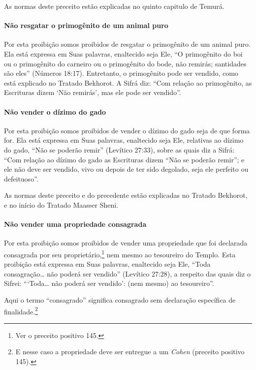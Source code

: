 As normas deste preceito estão explicadas no quinto capitulo de Temurá.

\paragraph{Não resgatar o primogênito de um animal puro}

Por esta proibição somos proibidos de resgatar o primogênito de um
animal puro. Ela está expressa em Suas palavras, enaltecido seja Ele,
``O primogênito do boi ou o primogênito do carneiro ou o primogênito do
bode, não remirás; santidades são eles'' (Números 18:17). Entretanto, o
primogênito pode ser vendido, como está explicado no Tratado Bekhorot. A
Sifrá diz: ``Com relação ao primogênito, as Escrituras dizem `Não
remirás', mas ele pode ser vendido''.

\paragraph{Não vender o dízimo do gado}

Por esta proibição somos proibidos de vender o dízimo do gado seja de
que forma for. Ela está expressa em Suas palavras, enaltecido seja Ele,
relativas ao dízimo do gado, ``Não se poderão remir'' (Levítico 27:33),
sobre as quais diz a Sifrá: ``Com relação ao dízimo do gado as
Escrituras dizem ``Não se poderão remir''; e ele não deve ser vendido,
vivo ou depois de ter sido degolado, seja ele perfeito ou defeituoso''.

As normas deste preceito e do precedente estão explicadas no Tratado
Bekhorot, e no início do Tratado Maasser Sheni.

\paragraph{Não vender uma propriedade consagrada}

Por esta proibição somos proibidos de vender uma propriedade que foi
declarada consagrada por seu proprietário,\footnote{Ver o preceito positivo 145.} nem
mesmo ao tesoureiro do Templo. Esta proibição está expressa em Suas
palavras, enaltecido seja Ele,
``Toda consagração\ldots{} não poderá ser vendido'' (Levítico 27:28), a
respeito das quais diz o Sifrei: ```Toda\ldots{} não poderá ser vendido':
(nem mesmo) ao tesoureiro''.

Aqui o termo ``consagrado'' significa consagrado sem declaração
específica de finalidade.\footnote{E nesse caso a propriedade deve ser entregue a um \textit{Cohen} (preceito positivo 145).}


